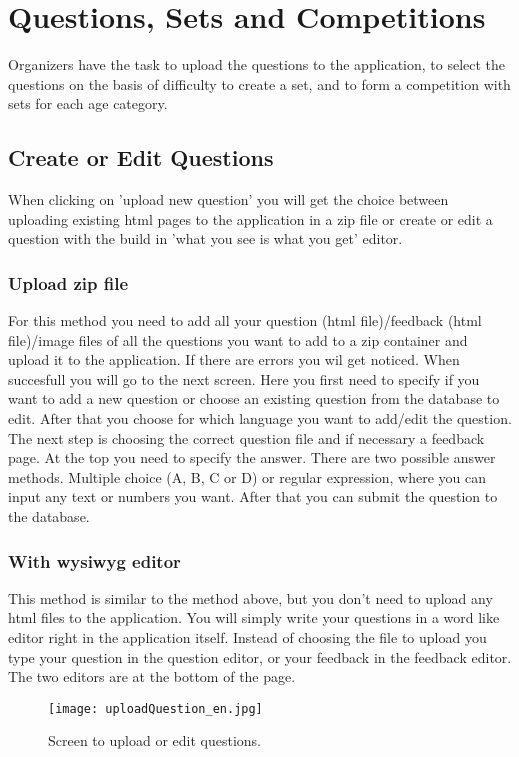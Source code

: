 \documentclass[11pt,a4paper]{report}
\begin{document}
\section{Questions, Sets and Competitions}
Organizers have the task to upload the questions to the application, to select the questions on the basis of difficulty to create a set, and to form a competition with sets for each age category.

\subsection{Create or Edit Questions}
When clicking on 'upload new question' you will get the choice between uploading existing html pages to the application in a zip file or create or edit a question with the build in 'what you see is what you get' editor.

\subsubsection{Upload zip file}
For this method you need to add all your question (html file)/feedback (html file)/image files of all the questions you want to add to a zip container and upload it to the application. If there are errors you wil get noticed. When succesfull you will go to the next screen. Here you first need to specify if you want to add a new question or choose an existing question from the database to edit. After that you choose for which language you want to add/edit the question. The next step is choosing the correct question file and if necessary a feedback page. At the top you need to specify the answer. There are two possible answer methods. Multiple choice (A, B, C or D) or regular expression, where you can input any text or numbers you want. After that you can submit the question to the database.

\subsubsection{With wysiwyg editor}
This method is similar to the method above, but you don't need to upload any html files to the application. You will simply write your questions in a word like editor right in the application itself.  Instead of choosing the file to upload you type your question in the question editor, or your feedback in the feedback editor. The two editors are at the bottom of the page.
\begin{figure}[h!]
\centering
\texttt{[image: uploadQuestion\_en.jpg]}
\caption{Screen to upload or edit questions.}
\label{fig:uploadQuestion}
\end{figure}
\end{document}
